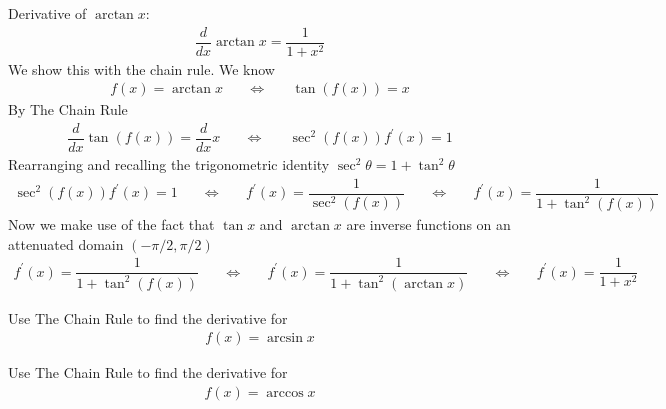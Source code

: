 \begin{theorem}
Derivative of $\arctan x$:
\begin{align*}
    \dfrac{d}{dx} \arctan x = \dfrac{1}{1+x^{2}}
\end{align*}
We show this with the chain rule. We know
\begin{align*}
    f(x) = \arctan x \hspace{20pt} \Longleftrightarrow \hspace{20pt} \tan(f(x)) = x
\end{align*}
By The Chain Rule
\begin{align*}
    \dfrac{d}{dx}\tan(f(x)) = \dfrac{d}{dx}x \hspace{20pt} \Longleftrightarrow \hspace{20pt} \sec^{2}(f(x))f^{'}(x) = 1
\end{align*}
Rearranging and recalling the trigonometric identity $\sec^{2}\theta = 1 + \tan^{2}\theta$
\begin{align*}
    \sec^{2}(f(x))f^{'}(x) = 1 \hspace{20pt} \Longleftrightarrow \hspace{20pt} f^{'}(x) = \dfrac{1}{\sec^{2}(f(x))} \hspace{20pt} \Longleftrightarrow \hspace{20pt} f^{'}(x) = \dfrac{1}{1 + \tan^{2}(f(x))} 
\end{align*}
Now we make use of the fact that $\tan x$ and $\arctan x$ are inverse functions on an attenuated domain $(-\pi/2, \pi/2)$
\begin{align*}
    f^{'}(x) = \dfrac{1}{1+\tan^{2}(f(x))} \hspace{20pt} \Longleftrightarrow \hspace{20pt} f^{'}(x) = \dfrac{1}{1+\tan^{2}(\arctan x)} \hspace{20pt} \Longleftrightarrow \hspace{20pt} f^{'}(x) = \dfrac{1}{1+x^{2}}
\end{align*}
\end{theorem}

\begin{exercise}
Use The Chain Rule to find the derivative for
\begin{align*}
    f(x) = \arcsin x
\end{align*}
\end{exercise}

\begin{exercise}
Use The Chain Rule to find the derivative for
\begin{align*}
    f(x) = \arccos x
\end{align*}
\end{exercise}

